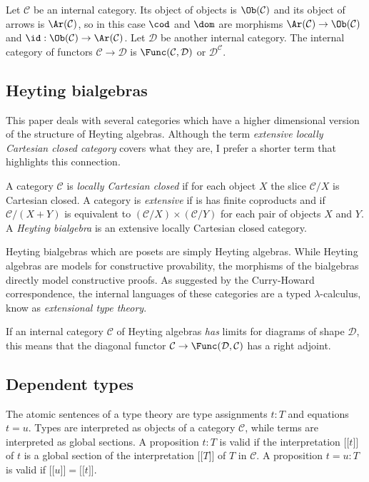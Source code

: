 \documentclass{tac}
\newcommand\cat\mathcal
\newcommand\of{:}
\newcommand\db[1]{{[\![}#1{]\!]}}
\begin{document}
Let $\cat C$ be an internal category. Its object of objects is $\Ob(\cat C)$ and its object of arrows is $\Ar(\cat C)$, so in this case $\cod$ and $\dom$ are morphisms $\Ar(\cat C)\to\Ob(\cat C)$ and $\id\of\Ob(\cat C)\to\Ar(\cat C)$. Let $\cat D$ be another internal category. The internal category of functors $\cat C\to\cat D$ is $\Func(\cat C,\cat D)$ or $\cat D^{\cat C}$.

\subsection{Heyting bialgebras}
This paper deals with several categories which have a higher dimensional version of the structure of Heyting algebras. Although the term \emph{extensive locally Cartesian closed category} covers what they are, I prefer a shorter term that highlights this connection.

\begin{definition} A category $\cat C$ is \emph{locally Cartesian closed} if for each object $X$ the slice $\cat C/X$ is Cartesian closed. A category is \emph{extensive} if is has finite coproducts and if $\cat C/(X+Y)$ is equivalent to $(\cat C/X)\times(\cat C/Y)$ for each pair of objects $X$ and $Y$. A \emph{Heyting bialgebra} is an extensive locally Cartesian closed category. \label{Heyting bialgebra}
\end{definition}

Heyting bialgebras which are posets are simply Heyting algebras. While Heyting algebras are models for constructive provability, the morphisms of the bialgebras directly model constructive proofs. As suggested by the Curry-Howard correspondence, the internal languages of these categories are a typed $\lambda$-calculus, know as \emph{extensional type theory}.

If an internal category $\cat C$ of Heyting algebras \emph{has} limits for diagrams of shape $\cat D$, this means that the diagonal functor $\cat C\to\Func(\cat D,\cat C)$ has a right adjoint.

\subsection{Dependent types}
The atomic sentences of a type theory are type assignments $t\of T$ and equations $t=u$. Types are interpreted as objects of a category $\cat C$, while terms are interpreted as global sections. A proposition $t\of T$ is valid if the interpretation $\db t$ of $t$ is a global section of the interpretation $\db T$ of $T$ in $\cat C$. A proposition $t=u\of T$ is valid if $\db u=\db t$. 
\end{document}
